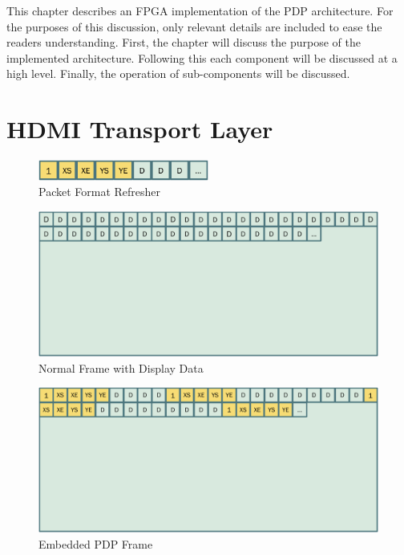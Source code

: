 \label{chap:implementation}
This chapter describes an FPGA implementation of the PDP architecture\cite{LandwehrEtAl2019_2,JacksonEtAl2019,BrowningEtAl2020}. For the purposes of this discussion, only relevant details are included to ease the readers understanding. First, the chapter will discuss the purpose of the implemented architecture. Following this each component will be discussed at a high level. Finally, the operation of sub-components will be discussed.
\section{HDMI Transport Layer}
    \label{sec:hdmi_transport_layer}
    \begin{figure}
        \centering
        \includegraphics[width=0.5\textwidth]{fig/packet_refresher.pdf}
        \caption{Packet Format Refresher}
        \label{fig:packet_refresher}
    \end{figure}
    \begin{figure}
        \centering
        \includegraphics[width=1.0\textwidth]{fig/classic_video.pdf}
        \caption{Normal Frame with Display Data}
        \label{fig:classic_video}
    \end{figure}
    \begin{figure}
        \centering
        \includegraphics[width=1.0\textwidth]{fig/embedded_frame.pdf}
        \caption{Embedded PDP Frame}
        \label{fig:embedded_frame}
    \end{figure}
